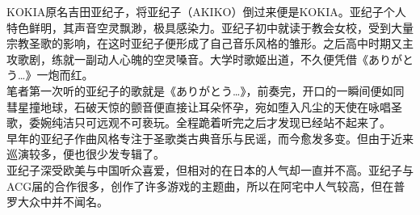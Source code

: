 \documentclass{ctexart}
\begin{document}
\begin{figure}[h]
\end{figure}

KOKIA原名吉田亚纪子，将亚纪子（AKIKO）倒过来便是KOKIA。亚纪子个人特色鲜明，其声音空灵飘渺，极具感染力。亚纪子初中就读于教会女校，受到大量宗教圣歌的影响，在这时亚纪子便形成了自己音乐风格的雏形。之后高中时期又主攻歌剧，练就一副动人心魄的空灵嗓音。大学时歌姬出道，不久便凭借《ありがとう…》一炮而红。\\
笔者第一次听的亚纪子的歌就是《ありがとう…》，前奏完，开口的一瞬间便如同彗星撞地球，石破天惊的颤音便直接让耳朵怀孕，宛如堕入凡尘的天使在咏唱圣歌，委婉纯洁只可远观不可亵玩。全程跪着听完之后才发现已经站不起来了。\\
早年的亚纪子作曲风格专注于圣歌类古典音乐与民谣，而今愈发多变。但由于近来巡演较多，便也很少发专辑了。\\
亚纪子深受欧美与中国听众喜爱，但相对的在日本的人气却一直并不高。亚纪子与ACG届的合作很多，创作了许多游戏的主题曲，所以在阿宅中人气较高，但在普罗大众中并不闻名。\\
\end{document}
